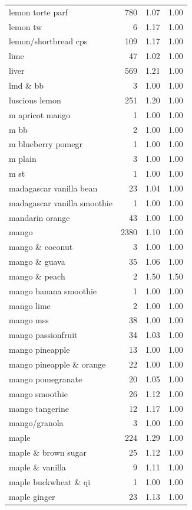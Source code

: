 \begin{table}
\begin{tabular}{lrrr}
lemon torte parf & 780 & 1.07 & 1.00 \\
lemon tw & 6 & 1.17 & 1.00 \\
lemon/shortbread cps & 109 & 1.17 & 1.00 \\
lime & 47 & 1.02 & 1.00 \\
liver & 569 & 1.21 & 1.00 \\
lmd \& bb & 3 & 1.00 & 1.00 \\
luscious lemon & 251 & 1.20 & 1.00 \\
m apricot mango & 1 & 1.00 & 1.00 \\
m bb & 2 & 1.00 & 1.00 \\
m blueberry pomegr & 1 & 1.00 & 1.00 \\
m plain & 3 & 1.00 & 1.00 \\
m st & 1 & 1.00 & 1.00 \\
madagascar vanilla bean & 23 & 1.04 & 1.00 \\
madagascar vanilla smoothie & 1 & 1.00 & 1.00 \\
mandarin orange & 43 & 1.00 & 1.00 \\
mango & 2380 & 1.10 & 1.00 \\
mango \& coconut & 3 & 1.00 & 1.00 \\
mango \& guava & 35 & 1.06 & 1.00 \\
mango \& peach & 2 & 1.50 & 1.50 \\
mango banana smoothie & 1 & 1.00 & 1.00 \\
mango lime & 2 & 1.00 & 1.00 \\
mango mss & 38 & 1.00 & 1.00 \\
mango passionfruit & 34 & 1.03 & 1.00 \\
mango pineapple & 13 & 1.00 & 1.00 \\
mango pineapple \& orange & 22 & 1.00 & 1.00 \\
mango pomegranate & 20 & 1.05 & 1.00 \\
mango smoothie & 26 & 1.12 & 1.00 \\
mango tangerine & 12 & 1.17 & 1.00 \\
mango/granola & 3 & 1.00 & 1.00 \\
maple & 224 & 1.29 & 1.00 \\
maple \& brown sugar & 25 & 1.12 & 1.00 \\
maple \& vanilla & 9 & 1.11 & 1.00 \\
maple buckwheat \& qi & 1 & 1.00 & 1.00 \\
maple ginger & 23 & 1.13 & 1.00 \\

\end{tabular}
\end{table}
